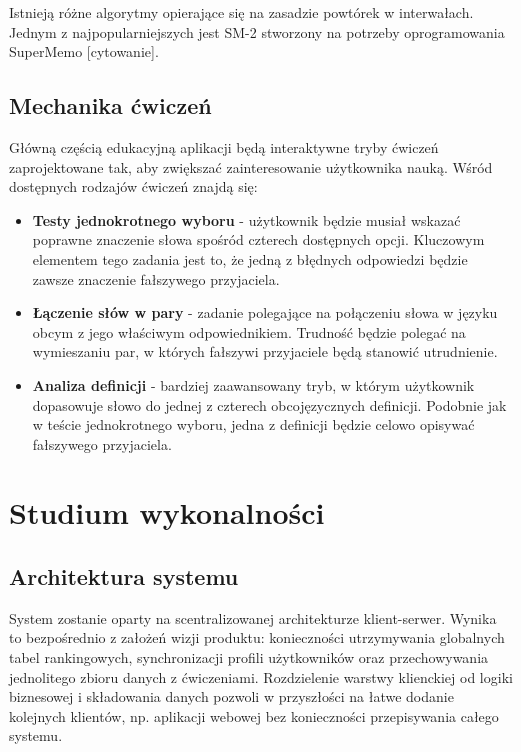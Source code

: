 \documentclass[polish]{aghengthesis}
\begin{document}
Istnieją różne algorytmy opierające się na zasadzie powtórek w interwałach. Jednym
z najpopularniejszych jest SM-2 stworzony na potrzeby oprogramowania SuperMemo
[cytowanie].



\subsection{Mechanika ćwiczeń}
Główną częścią edukacyjną aplikacji będą interaktywne tryby ćwiczeń zaprojektowane
tak, aby zwiększać zainteresowanie użytkownika nauką. Wśród dostępnych rodzajów
ćwiczeń znajdą się:
\begin{itemize}
    \item \textbf{Testy jednokrotnego wyboru} - użytkownik będzie musiał wskazać
    poprawne znaczenie słowa spośród czterech dostępnych opcji. Kluczowym elementem
    tego zadania jest to, że jedną z błędnych odpowiedzi będzie zawsze znaczenie
    fałszywego przyjaciela.
    \item \textbf{Łączenie słów w pary} - zadanie polegające na połączeniu słowa
    w języku obcym z jego właściwym odpowiednikiem. Trudność będzie polegać na
    wymieszaniu par, w których fałszywi przyjaciele będą stanowić utrudnienie.
    \item \textbf{Analiza definicji} - bardziej zaawansowany tryb, w którym
    użytkownik dopasowuje słowo do jednej z czterech obcojęzycznych definicji.
    Podobnie jak w teście jednokrotnego wyboru, jedna z definicji będzie celowo
    opisywać fałszywego przyjaciela.
\end{itemize}


\section{Studium wykonalności}
\subsection{Architektura systemu}
System zostanie oparty na scentralizowanej architekturze klient-serwer. Wynika
to bezpośrednio z założeń wizji produktu: konieczności utrzymywania globalnych
tabel rankingowych, synchronizacji profili użytkowników oraz przechowywania
jednolitego zbioru danych z ćwiczeniami. Rozdzielenie warstwy klienckiej od logiki
biznesowej i składowania danych pozwoli w przyszłości na łatwe dodanie kolejnych
klientów, np. aplikacji webowej bez konieczności przepisywania całego systemu.
\end{document}
